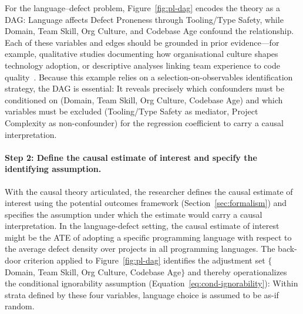 For the language--defect problem, Figure~\ref{fig:pl-dag} encodes the theory as a DAG: Language affects Defect Proneness through Tooling/Type Safety, while Domain, Team Skill, Org Culture, and Codebase Age confound the relationship.
Each of these variables and edges should be grounded in prior evidence---for example, qualitative studies documenting how organisational culture shapes technology adoption, or descriptive analyses linking team experience to code quality~\cite{DBLP:journals/tse/Murphy-HillJSSP21,DBLP:journals/ese/ScholtesMS16}.
Because this example relies on a selection-on-observables identification strategy, the DAG is essential: It reveals precisely which confounders must be conditioned on (Domain, Team Skill, Org Culture, Codebase Age) and which variables must be excluded (Tooling/Type Safety as mediator, Project Complexity as non-confounder) for the regression coefficient to carry a causal interpretation.

\paragraph{Step 2: Define the causal estimate of interest and specify the identifying assumption.}
With the causal theory articulated, the researcher defines the causal estimate of interest using the potential outcomes framework (Section~\ref{sec:formalism}) and specifies the assumption under which the estimate would carry a causal interpretation.
In the language-defect setting, the causal estimate of interest might be the ATE of adopting a specific programming language with respect to the average defect density over projects in all programming languages.
The back-door criterion applied to Figure~\ref{fig:pl-dag} identifies the adjustment set $\{$Domain, Team Skill, Org Culture, Codebase Age$\}$ and thereby operationalizes the conditional ignorability assumption (Equation~\eqref{eq:cond-ignorability}): Within strata defined by these four variables, language choice is assumed to be as-if random.


